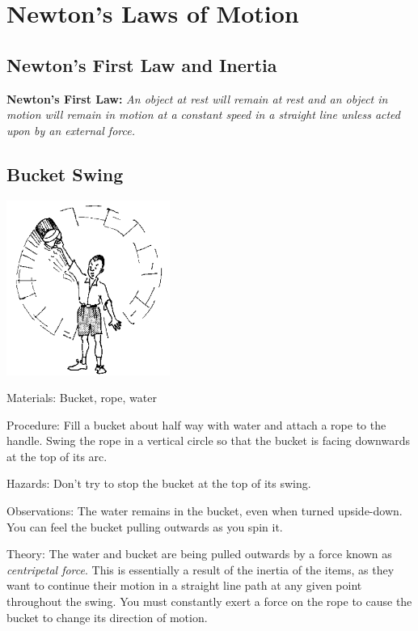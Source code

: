 \section{Newton's Laws of Motion}

\begin{multicols}{2}


\section*{Newton's First Law and Inertia}
\textbf{Newton's First Law: }\emph{An object at rest will remain at rest and an object in motion will remain in motion at a constant speed in a straight line unless acted upon by an external force.}

\subsection{Bucket Swing}

\begin{center}
\includegraphics[width=0.4\textwidth]{./img/source/bucket-swing.png}
\end{center}

\begin{description*}
\item[Materials:]{Bucket, rope, water}
\item[Procedure:]{Fill a bucket about half way with water and attach a rope to the handle. Swing the rope in a vertical circle so that the bucket is facing downwards at the top of its arc.}
\item[Hazards:]{Don't try to stop the bucket at the top of its swing.}
\item[Observations:]{The water remains in the bucket, even when turned upside-down. You can feel the bucket pulling outwards as you spin it.}
\item[Theory:]{The water and bucket are being pulled outwards by a force known as \emph{centripetal force}. This is essentially a result of the inertia of the items, as they want to continue their motion in a straight line path at any given point throughout the swing. You must constantly exert a force on the rope to cause the bucket to change its direction of motion.}
\end{description*}


\end{multicols}
